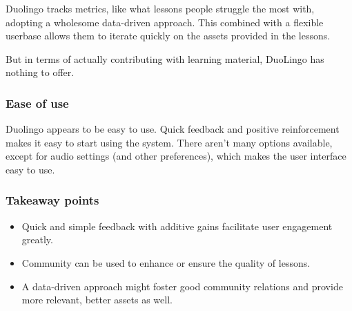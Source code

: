 Duolingo tracks metrics, like what lessons people struggle the most with, 
adopting a wholesome data-driven approach. This combined with a flexible 
userbase allows them to iterate quickly on the assets provided in the 
lessons\cite{duolingodatadriven}.

But in terms of actually contributing with learning material, DuoLingo has 
 nothing to offer.

\subsubsection{Ease of use}

Duolingo appears to be easy to use. Quick feedback and positive reinforcement 
makes it easy to start using the system. There aren't many options available, 
except for audio settings (and other preferences), which makes the user 
interface easy to use.

\subsubsection{Takeaway points}

\begin{itemize}
\item Quick and simple feedback with additive gains facilitate user engagement
  greatly.
\item Community can be used to enhance or ensure the quality of lessons.
\item A data-driven approach might foster good community relations and provide more
  relevant, better assets as well.
\end{itemize}
